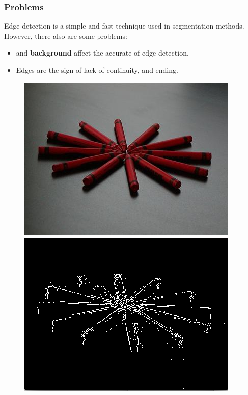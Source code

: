 \documentclass[notheorems,serif,table,compress]{beamer}  %
\begin{document}
\begin{frame}
\frametitle{Problems}
Edge detection is a simple and fast technique used in segmentation methods. However, there also are some problems:
    \begin{itemize}
        \item { and {\textbf{background}} affect the accurate of edge detection.}
        \item Edges are the sign of lack of continuity, and ending.
    \end{itemize}
    \begin{figure}
        \begin{minipage}[t]{0.4\linewidth}
        \centering
        \includegraphics[width=1\linewidth]{0_0_284.jpg} 
        \end{minipage}
        \begin{minipage}[t]{0.4\linewidth}
        \centering
        \includegraphics[width=1\linewidth]{noise.png} 
        \end{minipage}
    \end{figure}
\end{frame}
\end{document}
